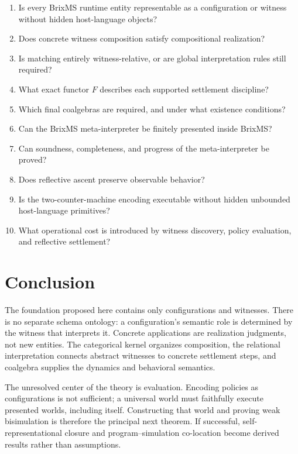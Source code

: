 \documentclass[11pt]{article}
\theoremstyle{remark}
\begin{document}
\begin{enumerate}[label=\textbf{F\arabic*.}]
  \item Is every BrixMS runtime entity representable as a configuration or
        witness without hidden host-language objects?
  \item Does concrete witness composition satisfy compositional realization?
  \item Is matching entirely witness-relative, or are global interpretation
        rules still required?
  \item What exact functor $F$ describes each supported settlement discipline?
  \item Which final coalgebras are required, and under what existence
        conditions?
  \item Can the BrixMS meta-interpreter be finitely presented inside BrixMS?
  \item Can soundness, completeness, and progress of the meta-interpreter be
        proved?
  \item Does reflective ascent preserve observable behavior?
  \item Is the two-counter-machine encoding executable without hidden
        unbounded host-language primitives?
  \item What operational cost is introduced by witness discovery, policy
        evaluation, and reflective settlement?
\end{enumerate}

\section{Conclusion}

The foundation proposed here contains only configurations and witnesses.
There is no separate schema ontology: a configuration's semantic role is
determined by the witness that interprets it. Concrete applications are
realization judgments, not new entities. The categorical kernel organizes
composition, the relational interpretation connects abstract witnesses to
concrete settlement steps, and coalgebra supplies the dynamics and behavioral
semantics.

The unresolved center of the theory is evaluation. Encoding policies as
configurations is not sufficient; a universal world must faithfully execute
presented worlds, including itself. Constructing that world and proving weak
bisimulation is therefore the principal next theorem. If successful,
self-representational closure and program--simulation co-location become
derived results rather than assumptions.



\end{document}
